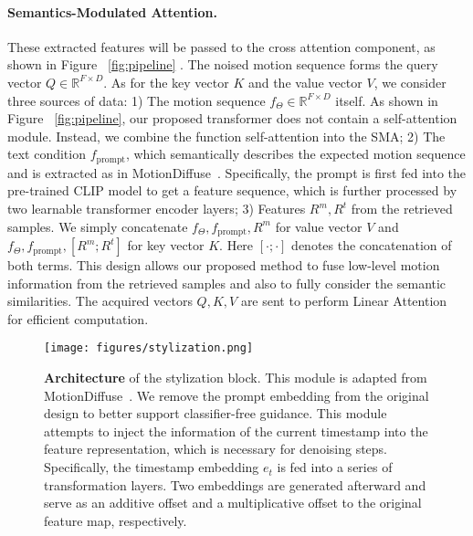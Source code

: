 \documentclass[10pt,twocolumn,letterpaper]{article}
\begin{document}
\paragraph{Semantics-Modulated Attention.} These extracted features will be passed to the cross attention component, as shown in Figure ~\ref{fig:pipeline} . The noised motion sequence forms the query vector $Q \in \mathbb{R}^{F \times D}$. As for the key vector $K$ and the value vector $V$, we consider three sources of data: 1) The motion sequence $f_{\Theta} \in \mathbb{R}^{F \times D}$ itself. As shown in Figure ~\ref{fig:pipeline}, our proposed transformer does not contain a self-attention module. Instead, we combine the function self-attention into the SMA; 2) The text condition $f_{\mathrm{prompt}}$, which semantically describes the expected motion sequence and is extracted as in MotionDiffuse~\cite{zhang2022motiondiffuse}. Specifically, the prompt is first fed into the pre-trained CLIP model to get a feature sequence, which is further processed by two learnable transformer encoder layers; 3) Features $R^m, R^t$ from the retrieved samples. We simply concatenate $f_{\Theta}, f_{\mathrm{prompt}}, R^m$ for value vector $V$ and $f_{\Theta}, f_{\mathrm{prompt}}, [R^m;R^t]$ for key vector $K$. Here $[\cdot;\cdot]$ denotes the concatenation of both terms. This design allows our proposed method to fuse low-level motion information from the retrieved samples and also to fully consider the semantic similarities. The acquired vectors $Q, K, V$ are sent to perform Linear Attention~\cite{shen2021efficient} for efficient computation.

\begin{figure}[]
    \centering
    \texttt{[image: figures/stylization.png]}
    \caption{\textbf{Architecture} of the stylization block. This module is adapted from MotionDiffuse~\cite{zhang2022motiondiffuse}. We remove the prompt embedding from the original design to better support classifier-free guidance. This module attempts to inject the information of the current timestamp into the feature representation, which is necessary for denoising steps. Specifically, the timestamp embedding $e_t$ is fed into a series of transformation layers. Two embeddings are generated afterward and serve as an additive offset and a multiplicative offset to the original feature map, respectively. }
    \label{fig:style}
    \vspace{-10pt}
\end{figure}
\end{document}
